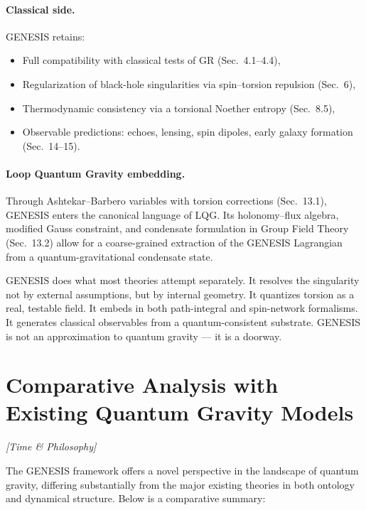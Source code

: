 \documentclass{article}
\newcommand{\timetag}{\textcolor{orange!80!black}{\textit{[Time \& Philosophy]}}}
\begin{document}
\paragraph{Classical side.}
GENESIS retains:
\begin{itemize}
    \item Full compatibility with classical tests of GR (Sec.~4.1–4.4),
    \item Regularization of black-hole singularities via spin–torsion repulsion (Sec.~6),
    \item Thermodynamic consistency via a torsional Noether entropy (Sec.~8.5),
    \item Observable predictions: echoes, lensing, spin dipoles, early galaxy formation (Sec.~14–15).
\end{itemize}

\paragraph{Loop Quantum Gravity embedding.}
Through Ashtekar–Barbero variables with torsion corrections (Sec.~13.1), GENESIS enters the canonical language of LQG.  
Its holonomy–flux algebra, modified Gauss constraint, and condensate formulation in Group Field Theory (Sec.~13.2) allow for a coarse-grained extraction of the GENESIS Lagrangian from a quantum-gravitational condensate state.


\vspace{-0.5em}
\begin{tcolorbox}[colback=white, colframe=blue!60!black, title=GENESIS bridges GR and Quantum Gravity, boxrule=1.1pt]
GENESIS does what most theories attempt separately.  
It resolves the singularity not by external assumptions, but by internal geometry.  
It quantizes torsion as a real, testable field.  
It embeds in both path-integral and spin-network formalisms.  
It generates classical observables from a quantum-consistent substrate.  
GENESIS is not an approximation to quantum gravity — it is a doorway.
\end{tcolorbox}




\section{Comparative Analysis with Existing Quantum Gravity Models} \label{sec:comparison}
\timetag

The GENESIS framework offers a novel perspective in the landscape of quantum gravity, differing substantially from the major existing theories in both ontology and dynamical structure. Below is a comparative summary:
\end{document}
